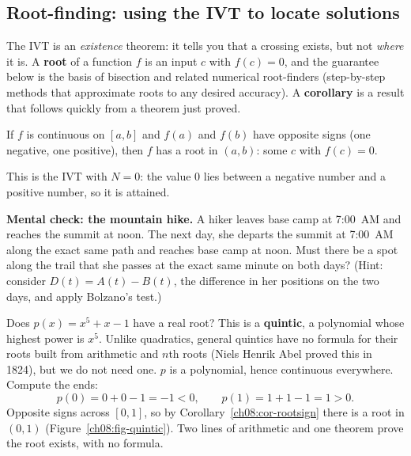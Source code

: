 \subsection{Root-finding: using the IVT to locate solutions}

The IVT is an \emph{existence} theorem: it tells you that a crossing exists, but not
\emph{where} it is. A \textbf{root} of a function $f$ is an input $c$ with $f(c)=0$, and
the guarantee below is the basis of bisection and related numerical root-finders
(step-by-step methods that approximate roots to any desired accuracy). A
\textbf{corollary} is a result that follows quickly from a theorem just proved.

\begin{corollary}
\label{ch08:cor-rootsign}
If $f$ is continuous on $[a,b]$ and $f(a)$ and $f(b)$ have opposite signs (one negative,
one positive), then $f$ has a root in $(a,b)$: some $c$ with $f(c)=0$.
\end{corollary}

This is the IVT with $N=0$: the value $0$ lies between a negative number and a
positive number, so it is attained.

\begin{marginnotebox}
\textbf{Mental check: the mountain hike.}
A hiker leaves base camp at 7:00~AM and reaches the summit at noon. The next day, she departs
the summit at 7:00~AM along the exact same path and reaches base camp at noon. Must there be
a spot along the trail that she passes at the exact same minute on both days? (Hint: consider
$D(t) = A(t) - B(t)$, the difference in her positions on the two days, and apply Bolzano's test.)
\end{marginnotebox}

\begin{example}
\label{ch08:ex-quintic}
Does $p(x)=x^5+x-1$ have a real root? This is a \textbf{quintic}, a polynomial whose
highest power is $x^5$. Unlike quadratics, general quintics have no formula for their
roots built from arithmetic and $n$th roots (Niels Henrik Abel proved this in 1824), but
we do not need one. $p$ is a polynomial, hence continuous everywhere.
Compute the ends:
\[
  p(0)=0+0-1=-1<0, \qquad p(1)=1+1-1=1>0.
\]
Opposite signs across $[0,1]$, so by Corollary~\ref{ch08:cor-rootsign} there is a root in
$(0,1)$ (Figure~\ref{ch08:fig-quintic}). Two lines of arithmetic and one theorem prove the
root exists, with no formula.
\end{example}

